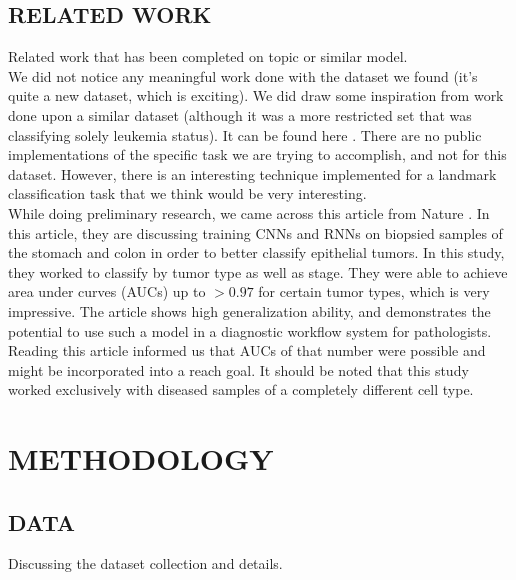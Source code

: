 \documentclass[%
 reprint,
 amsmath,amssymb,
 aps,
]{revtex4-1}
\begin{document}
\subsection{\label{sec:level2}RELATED WORK}
Related work that has been completed on topic or similar model. \\

We did not notice any meaningful work done with the dataset we found (it's quite a new dataset, which is exciting). We did draw some inspiration from work done upon a similar dataset (although it was a more restricted set that was classifying solely leukemia status). It can be found here \cite{Bone Marrow Cell Data}. There are no public implementations of the specific task we are trying to accomplish, and not for this dataset. However, there is an interesting technique implemented \cite{Landmark Classification} for a landmark classification task that we think would be very interesting. \\

While doing preliminary research, we came across this article from Nature \cite{Nature Article} . In this article, they are discussing training CNNs and RNNs on biopsied samples of the stomach and colon in order to better classify epithelial tumors. In this study, they worked to classify by tumor type as well as stage. They were able to achieve area under curves (AUCs) up to $>0.97$ for certain tumor types, which is very impressive. The article shows high generalization ability, and demonstrates the potential to use such a model in a diagnostic workflow system for pathologists. \\

Reading this article informed us that AUCs of that number were possible and might be incorporated into a reach goal. It should be noted that this study worked exclusively with diseased samples of a completely different cell type. \\





\section{\label{sec:level1}METHODOLOGY}
\subsection{\label{sec:level2}DATA}
Discussing the dataset collection and details. \\
\end{document}
